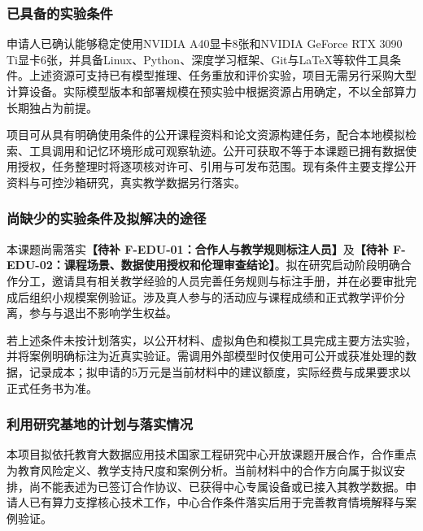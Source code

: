 \justifying
\NSFCBodyText

\subsubsection{已具备的实验条件}

申请人已确认能够稳定使用NVIDIA A40显卡8张和NVIDIA GeForce RTX 3090 Ti显卡6张，并具备Linux、Python、深度学习框架、Git与LaTeX等软件工具条件。上述资源可支持已有模型推理、任务重放和评价实验，项目无需另行采购大型计算设备。实际模型版本和部署规模在预实验中根据资源占用确定，不以全部算力长期独占为前提。

项目可从具有明确使用条件的公开课程资料和论文资源构建任务，配合本地模拟检索、工具调用和记忆环境形成可观察轨迹。公开可获取不等于本课题已拥有数据使用授权，任务整理时将逐项核对许可、引用与可发布范围。现有条件主要支撑公开资料与可控沙箱研究，真实教学数据另行落实。

\subsubsection{尚缺少的实验条件及拟解决的途径}

本课题尚需落实\textbf{【待补 F-EDU-01：合作人与教学规则标注人员】}及\textbf{【待补 F-EDU-02：课程场景、数据使用授权和伦理审查结论】}。拟在研究启动阶段明确合作分工，邀请具有相关教学经验的人员完善任务规则与标注手册，并在必要审批完成后组织小规模案例验证。涉及真人参与的活动应与课程成绩和正式教学评价分离，参与与退出不影响学生权益。

若上述条件未按计划落实，以公开材料、虚拟角色和模拟工具完成主要方法实验，并将案例明确标注为近真实验证。需调用外部模型时仅使用可公开或获准处理的数据，记录成本；拟申请的5万元是当前材料中的建议额度，实际经费与成果要求以正式任务书为准。

\subsubsection{利用研究基地的计划与落实情况}

本项目拟依托教育大数据应用技术国家工程研究中心开放课题开展合作，合作重点为教育风险定义、教学支持尺度和案例分析。当前材料中的合作方向属于拟议安排，尚不能表述为已签订合作协议、已获得中心专属设备或已接入其教学数据。申请人已有算力支撑核心技术工作，中心合作条件落实后用于完善教育情境解释与案例验证。
